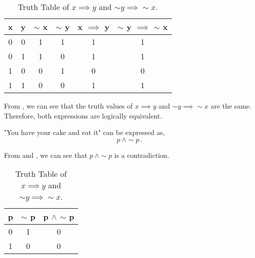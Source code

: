 \begin{subquestions}
\begin{subsubquestions}
\begin{table}[ht]
	\centering
	\begin{tabular}{|c|c|c|c|c|c|}
		\hline
		x & y & $\sim$ x & $\sim$ y & x $\implies$ y & $\sim$ y $\implies$ $\sim$ x \\
		\hline
		0 & 0 & 1 & 1 & 1 & 1 \\
		0 & 1 & 1 & 0 & 1 & 1 \\
		1 & 0 & 0 & 1 & 0 & 0 \\
		1 & 1 & 0 & 0 & 1 & 1 \\
		\hline
	\end{tabular}
	\caption{\label{2006:q1:tab:TruthTab1} Truth Table of $x \implies y$ and $\sim y \implies \sim x$.}
\end{table}

	
\subsubquestion

From , we can see that the truth values of $x \implies y$ and $\sim y \implies \sim x$ are the same. Therefore, both expressions are logically equivalent.

\end{subsubquestions}


\subquestion

\begin{subsubquestions}


\subsubquestion

"You have your cake and eat it" can be expressed as,
\begin{equation}
	p ~\land \sim p \,.
\end{equation}


\subsubquestion

From  and , we can see that $p ~\land \sim p$ is a contradiction.

\begin{table}[ht]
	\centering
	\begin{tabular}{|c|c|c|}
		\hline
		p & $\sim$ p & p $\land$ $\sim$ p \\
		\hline
		0 & 1 & 0 \\
		1 & 0 & 0 \\ 
		\hline
	\end{tabular}
	\caption{\label{2006:q1:tab:TruthTab2} Truth Table of $x \implies y$ and $\sim y \implies \sim x$.}
\end{table}


\end{subsubquestions}
\end{subquestions}
